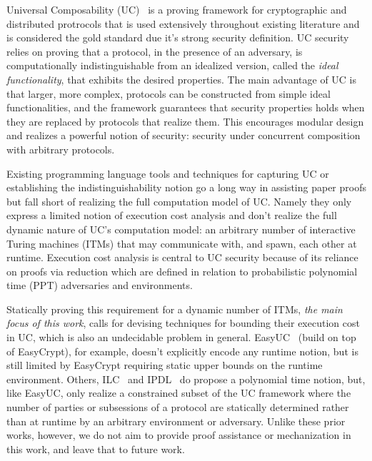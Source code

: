 
Universal Composability (UC)~\cite{canettiUC} is a proving framework for cryptographic and distributed protrocols that %
is used extensively throughout existing literature and is considered the gold standard due it's strong security definition.
UC security relies on proving that a protocol, in the presence of an adversary, is computationally indistinguishable from an idealized version, called the \emph{ideal functionality}, that exhibits the desired properties.
The main advantage of UC is that larger, more complex, protocols can be constructed from simple ideal functionalities, and the framework guarantees that security properties holds when 
they are replaced by protocols that realize them.
This encourages modular design and realizes a powerful notion of security: security under concurrent composition with arbitrary protocols.

Existing programming language tools and techniques for capturing UC or establishing the indistinguishability notion go a long way in assisting paper proofs but fall short of realizing the full computation model of UC.
Namely they only express a limited notion of execution cost analysis and don't realize the full dynamic nature of UC's computation model: an arbitrary number of interactive Turing machines (ITMs) that may communicate with, and spawn, each other at runtime.
Execution cost analysis is central to UC security because of its reliance on proofs via reduction which are defined in relation to probabilistic polynomial time (PPT) adversaries and environments.

Statically proving this requirement for a dynamic number of ITMs, \emph{the main focus of this work}, calls for devising techniques for bounding their execution cost in UC,
which is also an undecidable problem in general.
EasyUC~\cite{easyuc} (build on top of EasyCrypt), for example, doesn't explicitly encode any runtime notion, but is still limited by EasyCrypt requiring static upper bounds on the runtime environment.
Others, ILC~\cite{ilc} and IPDL~\cite{ipdl} do propose a polynomial time notion, but, like EasyUC, only realize a constrained subset of the UC framework where the number of parties or subsessions of a protocol are statically determined rather than at runtime by an arbitrary environment or adversary.
Unlike these prior works, however, we do not aim to provide proof assistance or mechanization in this work, and leave that to future work.

